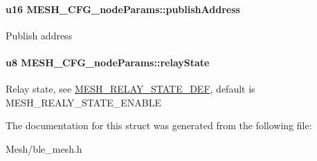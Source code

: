 \paragraph[{\texorpdfstring{publish\+Address}{publishAddress}}]{\setlength{\rightskip}{0pt plus 5cm}u16 M\+E\+S\+H\+\_\+\+C\+F\+G\+\_\+node\+Params\+::publish\+Address}\hypertarget{struct_m_e_s_h___c_f_g__node_params_a6bf31b37a2002d98d93de1ca1a854d27}{}\label{struct_m_e_s_h___c_f_g__node_params_a6bf31b37a2002d98d93de1ca1a854d27}
Publish address 
\paragraph[{\texorpdfstring{relay\+State}{relayState}}]{\setlength{\rightskip}{0pt plus 5cm}u8 M\+E\+S\+H\+\_\+\+C\+F\+G\+\_\+node\+Params\+::relay\+State}\hypertarget{struct_m_e_s_h___c_f_g__node_params_aada8547341e0a8a879d4970e548d9ebe}{}\label{struct_m_e_s_h___c_f_g__node_params_aada8547341e0a8a879d4970e548d9ebe}
Relay state, see \hyperlink{group___m_e_s_h___r_e_l_a_y___s_t_a_t_e___d_e_f}{M\+E\+S\+H\+\_\+\+R\+E\+L\+A\+Y\+\_\+\+S\+T\+A\+T\+E\+\_\+\+D\+EF}, default is M\+E\+S\+H\+\_\+\+R\+E\+A\+L\+Y\+\_\+\+S\+T\+A\+T\+E\+\_\+\+E\+N\+A\+B\+LE 

The documentation for this struct was generated from the following file\+:\begin{DoxyCompactItemize}
\item 
Mesh/ble\+\_\+mesh.\+h\end{DoxyCompactItemize}
